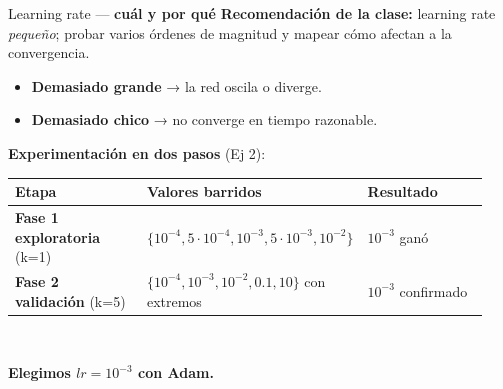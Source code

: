 \documentclass[11pt,aspectratio=169]{beamer}
\begin{document}
\begin{frame}{Learning rate — \textbf{cuál y por qué}}
\textbf{Recomendación de la clase:} learning rate \emph{pequeño}; probar varios órdenes de magnitud y mapear cómo afectan a la convergencia.\\[0.5em]

\begin{itemize}\setlength\itemsep{0.15em}\small
  \item \textbf{Demasiado grande} → la red oscila o diverge.
  \item \textbf{Demasiado chico} → no converge en tiempo razonable.
\end{itemize}
\vspace{0.6em}

\textbf{Experimentación en dos pasos} (Ej 2):\\[0.3em]

\centering\small
\begin{tabular}{@{}p{0.30\linewidth}p{0.36\linewidth}p{0.28\linewidth}@{}}
\toprule
\textbf{Etapa} & \textbf{Valores barridos} & \textbf{Resultado} \\
\midrule
\textbf{Fase 1 exploratoria} (k=1)  & $\{10^{-4}, 5\!\cdot\!10^{-4}, 10^{-3}, 5\!\cdot\!10^{-3}, 10^{-2}\}$ & $10^{-3}$ ganó \\
\rowcolor{accent2!10}
\textbf{Fase 2 validación} (k=5) & $\{10^{-4}, 10^{-3}, 10^{-2}, 0.1, 10\}$ con extremos & $10^{-3}$ confirmado \\
\bottomrule
\end{tabular}\\[0.6em]

\begin{takeaway}
\textbf{Elegimos $lr = 10^{-3}$ con Adam.}
\end{takeaway}
\end{frame}
\end{document}
